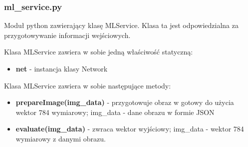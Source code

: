 \documentclass{article}
\begin{document}
\subsubsection{ml\_service.py}
Moduł python zawierający klasę MLService. Klasa ta jest odpowiedzialna za przygotowywanie informacji wejściowych.

Klasa MLService zawiera w sobie jedną właściwość statyczną:
\begin{itemize}
    \item \textbf{net} - instancja klasy Network
\end{itemize}

Klasa MLService zawiera w sobie następujące metody:
\begin{itemize}
    \item \textbf{prepareImage(img\_data)} - przygotowuje obraz w gotowy do użycia wektor 784 wymiarowy; img\_data - dane obrazu w formie JSON
    \item \textbf{evaluate(img\_data)} - zwraca wektor wyjściowy; img\_data - wektor 784 wymiarowy z danymi obrazu.
\end{itemize}


\pagebreak

\pagebreak

\pagebreak

\pagebreak

\pagebreak

\pagebreak

\pagebreak

\pagebreak

\pagebreak
\end{document}

